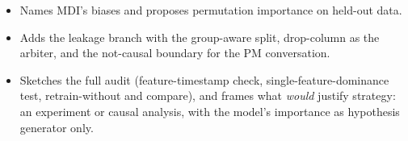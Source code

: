 \begin{interviewq}
\goodgreat
\begin{itemize}
    \item {} Names MDI's biases and proposes permutation importance on held-out data.
    \item {} Adds the leakage branch with the group-aware split, drop-column as the arbiter, and the not-causal boundary for the PM conversation.
    \item {} Sketches the full audit (feature-timestamp check, single-feature-dominance test, retrain-without and compare), and frames what \textit{would} justify strategy: an experiment or causal analysis, with the model's importance as hypothesis generator only.
\end{itemize}

\end{interviewq}

